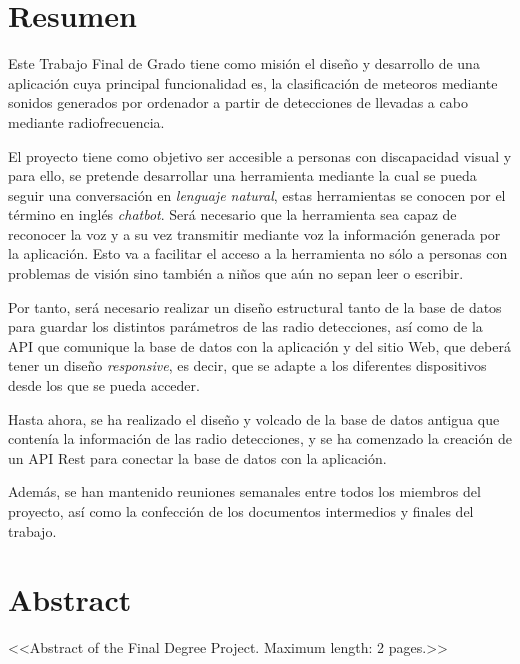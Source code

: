 \chapter*{Resumen}

Este Trabajo Final de Grado tiene como misión el diseño y desarrollo de una aplicación cuya principal funcionalidad es, la clasificación de  meteoros mediante sonidos generados por ordenador a partir de detecciones de llevadas a cabo mediante radiofrecuencia. 

El proyecto tiene como objetivo ser accesible a personas con discapacidad visual y para ello, se pretende desarrollar una herramienta mediante la cual se pueda seguir una conversación en \textit{lenguaje natural}, estas herramientas se conocen por el término en inglés \textit{chatbot}. Será necesario que la herramienta sea capaz de reconocer la voz y a su vez transmitir mediante voz la información generada por la aplicación.
Esto va a facilitar el acceso a la herramienta no sólo a personas con problemas de visión sino también a niños que aún no sepan leer o escribir.

Por tanto, será necesario realizar un diseño estructural tanto de la base de datos para guardar los distintos parámetros de las radio detecciones, así como de la API que comunique la base de datos con la aplicación y del sitio Web, que deberá tener un diseño \textit{responsive}, es decir, que se adapte a los diferentes dispositivos desde los que se pueda acceder.

Hasta ahora, se ha realizado el diseño y volcado de la base de datos antigua que contenía la información de las radio detecciones, y se ha comenzado la creación de un API Rest para conectar la base de datos con la aplicación.

Además, se han mantenido reuniones semanales entre todos los miembros del proyecto, así como la confección de los documentos intermedios y finales del trabajo.


\newpage

\chapter*{Abstract}

<<Abstract of the Final Degree Project. Maximum length: 2 pages.>>


